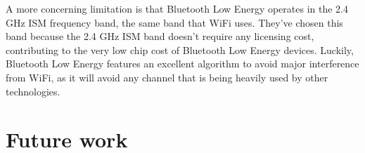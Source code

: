 \documentclass[pdftex,a4paper,12pt,twoside]{report}
\begin{document}
A more concerning limitation is that Bluetooth Low Energy operates in the 2.4 GHz ISM frequency band, the same band that WiFi uses. They've chosen this band because the 2.4 GHz ISM band doesn't require any licensing cost, contributing to the very low chip cost of Bluetooth Low Energy devices. Luckily, Bluetooth Low Energy features an excellent algorithm to avoid major interference from WiFi, as it will avoid any channel that is being heavily used by other technologies.


\section{Future work}
\label{sec:futurework}








\listoffigures
\listoftables
\end{document}
